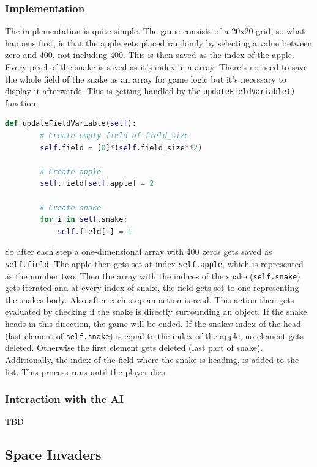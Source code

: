 \documentclass[12pt]{article}
\begin{document}
\subsubsection{Implementation}
The implementation is quite simple. The game consists of a 20x20 grid, so what happens first, is that the apple gets placed randomly by selecting a value between zero and 400, not including 400. This is then saved as the index of the apple. Every pixel of the snake is saved as it's index in a array. There's no need to save the whole field of the snake as an array for game logic but it's necessary to display it afterwards. This is getting handled by the \lstinline{updateFieldVariable()} function:
\begin{lstlisting}[language=Python, caption=Example - Create a snake field every second of size \lstinline{self.field_size}]
    def updateFieldVariable(self):
        # Create empty field of field_size
        self.field = [0]*(self.field_size**2)

        # Create apple
        self.field[self.apple] = 2
        
        # Create snake
        for i in self.snake:
            self.field[i] = 1
\end{lstlisting}
So after each step a one-dimensional array with 400 zeros gets saved as \lstinline{self.field}. The apple then gets set at index \lstinline{self.apple}, which is represented as the number two. Then the array with the indices of the snake (\lstinline{self.snake}) gets iterated and at every index of snake, the field gets set to one representing the snakes body. Also after each step an action is read. This action then gets evaluated by checking if the snake is directly surrounding an object. If the snake heads in this direction, the game will be ended. If the snakes index of the head (last element of \lstinline{self.snake}) is equal to the index of the apple, no element gets deleted. Otherwise the first element gets deleted (last part of snake). Additionally, the index of the field where the snake is heading, is added to the list. This process runs until the player dies.
\subsubsection{Interaction with the AI}
TBD
\subsection{Space Invaders}
\end{document}

